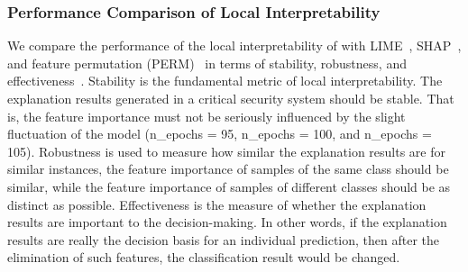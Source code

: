 \subsubsection{Performance Comparison of Local Interpretability}
We compare the performance of the local interpretability of \sys with LIME~\cite{lime}, SHAP~\cite{shap}, and feature permutation (PERM)~\cite{altmann2010permutation} in terms of stability, robustness, and effectiveness~\cite{fan2020can}. 
Stability is the fundamental metric of local interpretability. 
The explanation results generated in a critical security system should be stable. 
That is, the feature importance must not be seriously influenced by the slight fluctuation of the model (\eg n\_epochs = 95, n\_epochs = 100, and n\_epochs = 105). 
Robustness is used to measure how similar the explanation results are for similar instances, \ie the feature importance of samples of the same class should be similar, while the feature importance of samples of different classes should be as distinct as possible. 
Effectiveness is the measure of whether the explanation results are important to the decision-making. 
In other words, if the explanation results are really the decision basis for an individual prediction, then after the elimination of such features, the classification result would be changed. 

